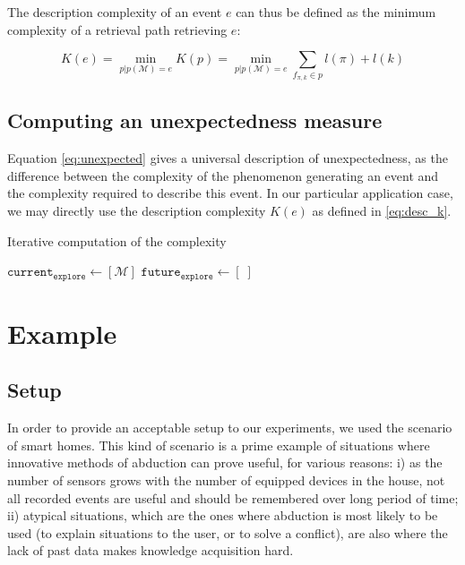 \documentclass[conference]{IEEEtran}
\begin{document}
The description complexity of an event $e$ can thus be defined as the minimum complexity of a retrieval path retrieving $e$:

\begin{equation}
  \label{eq:desc_k}
  K(e) = \min_{p | p(\mathcal{M}) = e} K(p) = \min_{p | p(\mathcal{M})=e} \sum_{f_{\pi, k} \in p} l(\pi) + l(k)
\end{equation}

\subsection{Computing an unexpectedness measure}
Equation \ref{eq:unexpected} gives a universal description of unexpectedness, as the difference between the complexity of the phenomenon generating an event and the complexity required to describe this event. In our particular application case, we may directly use the description complexity $K(e)$ as defined in \ref{eq:desc_k}.

\begin{algorithm}
  \caption{Iterative computation of the complexity}
  \label{alg:complex_iter}
  $\mathtt{current_{explore}} \leftarrow [\mathcal{M}]$ \;
  $\mathtt{future_{explore} \leftarrow} [\;]$ \;
\end{algorithm}

\section{Example}
\label{sec:example}
\subsection{Setup}
In order to provide an acceptable setup to our experiments, we used the scenario of smart homes. This kind of scenario is a prime example of situations where innovative methods of abduction can prove useful, for various reasons: i) as the number of sensors grows with the number of equipped devices in the house, not all recorded events are useful and should be remembered over long period of time; ii) atypical situations, which are the ones where abduction is most likely to be used (to explain situations to the user, or to solve a conflict), are also where the lack of past data makes knowledge acquisition hard.
\end{document}
